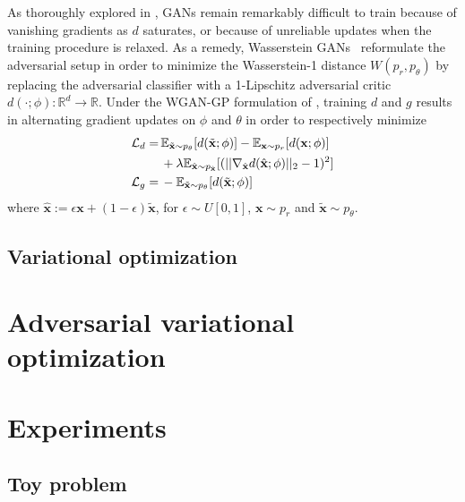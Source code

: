 \documentclass[twocolumn,superscriptaddress,aps]{revtex4-1}
\theoremstyle{plain}
\begin{document}
As thoroughly explored in \citep{2017arXiv170104862A}, GANs remain remarkably
difficult to train because of vanishing gradients as $d$ saturates, or because of
unreliable updates when the training procedure is relaxed. As a remedy,
Wasserstein GANs~\citep{2017arXiv170107875A} reformulate the adversarial
setup in order to minimize the Wasserstein-1 distance $W(p_r, p_\theta)$ by
replacing the adversarial classifier with a 1-Lipschitz adversarial critic
$d(\cdot; \phi) : \mathbb{R}^d \to \mathbb{R}$. Under the WGAN-GP formulation of \cite{2017arXiv170400028G},
training $d$ and $g$ results in alternating gradient updates on $\phi$ and $\theta$ in order to respectively minimize
\begin{align}
    {\cal L}_d =\,& \mathbb{E}_{\tilde{\mathbf{x}} \sim p_\theta} [d(\tilde{\mathbf{x}};\phi)] - \mathbb{E}_{\mathbf{x} \sim p_r} [d(\mathbf{x};\phi)]  \nonumber \\
                  & + \lambda \mathbb{E}_{\hat{\mathbf{x}} \sim p_{\hat{\mathbf{x}}}} [(|| \nabla_{\hat{\mathbf{x}}} d({\hat{\mathbf{x}}};\phi) ||_2 - 1)^2] \\
    {\cal L}_g =\,& -\mathbb{E}_{\tilde{\mathbf{x}} \sim p_\theta} [d(\tilde{\mathbf{x}};\phi)]
\end{align}
where ${\hat{\mathbf{x}}} := \epsilon \mathbf{x} + (1-\epsilon)\tilde{\mathbf{x}}$, for $\epsilon \sim U[0,1]$, $\mathbf{x} \sim p_r$ and $\tilde{\mathbf{x}} \sim p_\theta$.


\subsection{Variational optimization}



\section{Adversarial variational optimization}



\section{Experiments}

\subsection{Toy problem}
\end{document}
